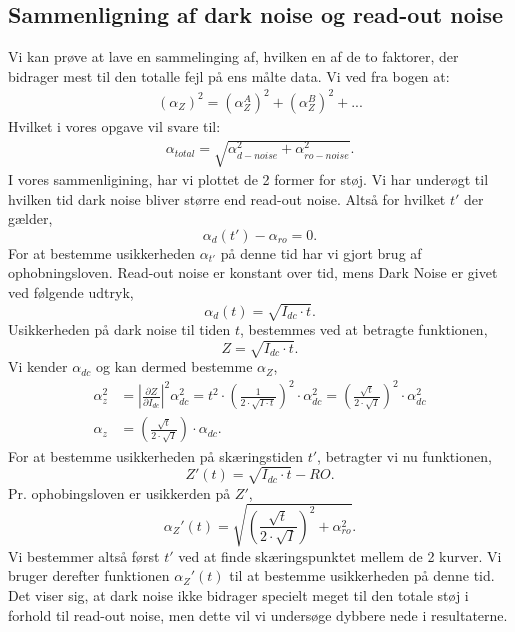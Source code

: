 \documentclass[working]{tuftebook}
\begin{document}
\subsection{Sammenligning af dark noise og read-out noise}
Vi kan prøve at lave en sammelinging af, hvilken en af de to faktorer, der bidrager mest til den totalle fejl på ens målte data. Vi ved fra bogen  at: 
\begin{align*}
(\alpha_Z)^2 =(\alpha_Z^A)^2+(\alpha_Z^B)^2 + ...
\end{align*}
Hvilket i vores opgave vil svare til:
\begin{align*}
\alpha_{total} = \sqrt{\alpha_{d-noise}^2 + \alpha_{ro-noise}^2}. 
\end{align*}
I vores sammenligining, har vi plottet de 2 former for støj. Vi har underøgt til hvilken tid dark noise bliver større end read-out noise. Altså for hvilket $t'$ der gælder,
\[
	\alpha _{d} \left( t' \right)  - \alpha _{ro} = 0
.\]
For at bestemme usikkerheden $\alpha _{t'}$ på denne tid har vi gjort brug af ophobningsloven. Read-out noise er konstant over tid, mens Dark Noise er givet ved følgende udtryk,
\[
\alpha _d \left( t \right) = \sqrt{I_{dc}\cdot t} 
.\]
Usikkerheden på dark noise til tiden $t$, bestemmes ved at betragte funktionen,
\[
Z = \sqrt{I_{dc}\cdot t} 
.\] 
Vi kender $\alpha _{dc}$ og kan dermed bestemme $\alpha _Z$,
\begin{align*}
	\alpha_{z}^2 &= \left| \frac{\partial Z}{\partial I_{dc}} \right|^2\alpha_{dc}^2 = t^2 \cdot \left( \frac{1}{2\cdot \sqrt{I\cdot t} } \right)^2\cdot \alpha _{dc}^2 = \left( \frac{\sqrt{t}}{ 2\cdot \sqrt{I}} \right)^2 \cdot \alpha _{dc}^2 \\
	\alpha _z &= \left( \frac{\sqrt{t} }{2\cdot \sqrt{I} } \right) \cdot \alpha _{dc}
.\end{align*}
For at bestemme usikkerheden på skæringstiden $t'$, betragter vi nu funktionen,
 \[
Z'\left( t \right) = \sqrt{I_{dc}\cdot t} - RO
.\] 
Pr. ophobingsloven er usikkerden på $Z'$,
 \[
\alpha _Z'\left( t \right)  = \sqrt{\left( \frac{\sqrt{t} }{2\cdot \sqrt{I} } \right)^2 + \alpha _{ro}^2 }
.\]
Vi bestemmer altså først $t'$ ved at finde skæringspunktet mellem de 2 kurver. Vi bruger derefter funktionen $\alpha _Z'\left( t \right) $ til at bestemme usikkerheden på denne tid. \\
Det viser sig, at dark noise ikke bidrager specielt meget til den totale støj i forhold til read-out noise, men dette vil vi undersøge dybbere nede i resultaterne.
\end{document}
